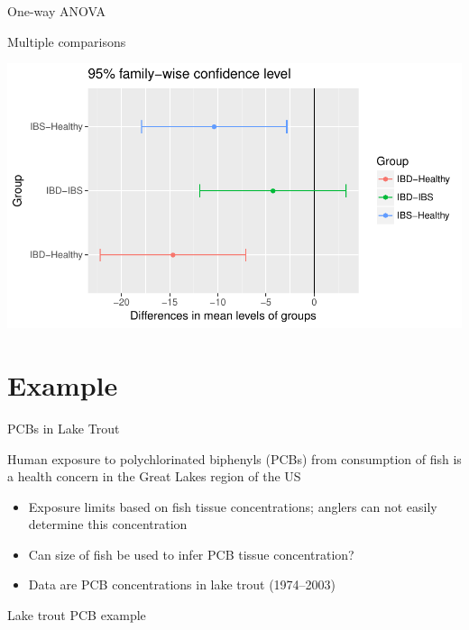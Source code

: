 \documentclass[10pt,ignorenonframetext,compress, aspectratio=169]{beamer}
\providecommand{\tightlist}{%
  \setlength{\itemsep}{0pt}\setlength{\parskip}{0pt}}
\begin{document}
\begin{frame}{One-way ANOVA}

Multiple comparisons

\begin{center}\includegraphics[width=0.7\linewidth]{03-linear-models_files/figure-beamer/verbal-2-plot-1} \end{center}

\end{frame}

\section{Example}\label{example}

\begin{frame}{PCBs in Lake Trout}

Human exposure to polychlorinated biphenyls (PCBs) from consumption of
fish is a health concern in the Great Lakes region of the US

\begin{itemize}
\tightlist
\item
  Exposure limits based on fish tissue concentrations; anglers can not
  easily determine this concentration
\item
  Can size of fish be used to infer PCB tissue concentration?
\item
  Data are PCB concentrations in lake trout (1974--2003)
\end{itemize}

\end{frame}

\begin{frame}{Lake trout PCB example}

\scriptsize

\normalsize

\end{frame}
\end{document}
